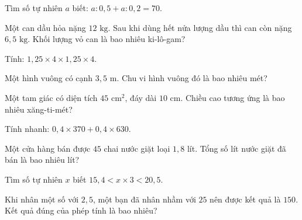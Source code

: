 \begin{ex}
  Tìm số tự nhiên $a$ biết: $a : 0{,}5 + a : 0{,}2 = 70$.
\end{ex}

\begin{ex}
  Một can dầu hỏa nặng $12\text{ kg}$. Sau khi dùng hết nửa lượng dầu thì can còn nặng $6{,}5\text{ kg}$. Khối lượng vỏ can là bao nhiêu ki-lô-gam?
\end{ex}

\begin{ex}
  Tính: $1{,}25 \times 4 \times 1{,}25 \times 4$.
\end{ex}

\begin{ex}
  Một hình vuông có cạnh $3{,}5\text{ m}$. Chu vi hình vuông đó là bao nhiêu mét?
\end{ex}

\begin{ex}
  Một tam giác có diện tích $45\text{ cm}^2$, đáy dài $10\text{ cm}$. Chiều cao tương ứng là bao nhiêu xăng-ti-mét?
\end{ex}

\begin{ex}
  Tính nhanh: $0{,}4 \times 370 + 0{,}4 \times 630$.
\end{ex}

\begin{ex}
  Một cửa hàng bán được $45$ chai nước giặt loại $1{,}8$ lít. Tổng số lít nước giặt đã bán là bao nhiêu lít?
\end{ex}

\begin{ex}
  Tìm số tự nhiên $x$ biết $15{,}4 < x \times 3 < 20{,}5$.
\end{ex}

\begin{ex}
  Khi nhân một số với $2{,}5$, một bạn đã nhân nhầm với $25$ nên được kết quả là $150$. Kết quả đúng của phép tính là bao nhiêu?
\end{ex}
